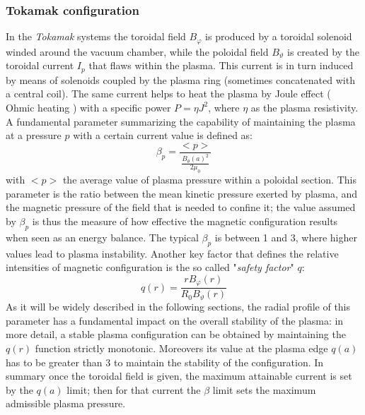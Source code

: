 \subsubsection{Tokamak configuration}
In the \textit{Tokamak} systems the toroidal field $B_\varphi$ is produced by a toroidal solenoid winded around the vacuum chamber, while the poloidal field $B_\vartheta$ is created by the toroidal current $I_p$ that flaws within the plasma. This current is in turn induced by means of solenoids coupled by the plasma ring (sometimes concatenated with a central coil). The same current helps to heat the plasma by Joule effect ( Ohmic heating ) with a specific power $P = \eta J^2$, where $\eta$ as the plasma resistivity.
%
A fundamental parameter summarizing the capability of maintaining the plasma at a pressure $p$ with a certain current value is defined as:
\begin{equation}
    \beta_p = \frac{<p>}{ \frac{B_{\theta}(a)^2}{2\mu_0} }
    \label{eq:magnetic_beta}
\end{equation}
with $<p>$ the average value of plasma pressure within a poloidal section. This parameter is the ratio between the mean kinetic pressure exerted by plasma, and the magnetic pressure of the field that is needed to confine it; the value assumed by $\beta_p$ is thus the measure of how effective the magnetic configuration results when seen as an energy balance. The typical $\beta_p$  is between 1 and 3, where higher values lead to plasma instability.
Another key factor that defines the relative intensities of magnetic configuration is the so called "\textit{safety factor}" $q$:
\begin{equation}
    q(r) = \frac{rB_\varphi(r)}{R_0B_\vartheta(r)}
\end{equation}
As it will be widely described in the following sections, the radial profile of this parameter has a fundamental impact on the overall stability of the plasma: in more detail, a stable plasma configuration can be obtained by maintaining the $q(r)$ function strictly monotonic. Moreovers its value at the plasma edge $q(a)$ has to be greater than 3 to maintain the stability of the configuration. 
In summary once the toroidal field is given, the maximum attainable current is set by the $q(a)$ limit; then for that current the $\beta$ limit sets the maximum admissible plasma pressure.
